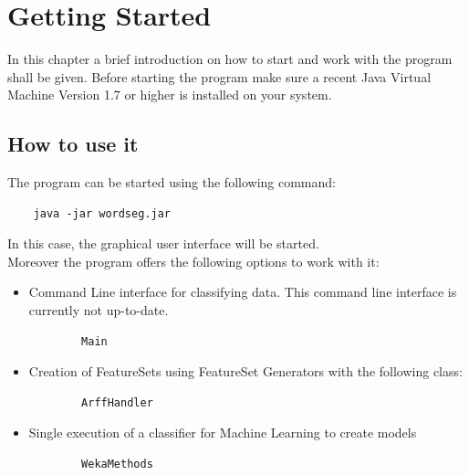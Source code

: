 \documentclass[10pt,a4paper,titlepage]{report}
\begin{document}
	\chapter{Getting Started}
	In this chapter a brief introduction on how to start and work with the program shall be given. Before starting the program make sure a recent Java Virtual Machine Version 1.7 or higher is installed on your system.
	\section{How to use it}
	The program can be started using the following command: \begin{lstlisting}
	java -jar wordseg.jar
	\end{lstlisting}
	In this case, the graphical user interface will be started.\\
	Moreover the program offers the following options to work with it:
	\begin{itemize}
		\item Command Line interface for classifying data. This command line interface is currently not up-to-date.
		\begin{lstlisting}
		Main
		\end{lstlisting}
		\item Creation of FeatureSets using FeatureSet Generators with the following class:
		\begin{lstlisting}
		ArffHandler
		\end{lstlisting}
		\item Single execution of a classifier for Machine Learning to create models
		\begin{lstlisting}
		WekaMethods
		\end{lstlisting} 
	\end{itemize}
	\clearpage
\end{document}
